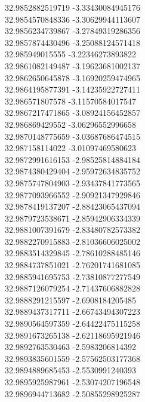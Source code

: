 {32.9852882519719	-3.33430084945176\\
32.9854570848336	-3.30629944113607\\
32.9856234739867	-3.27849319286356\\
32.9857874430496	-3.25088124571418\\
32.985949015555	-3.22346273893822\\
32.9861082149487	-3.19623681002137\\
32.9862650645878	-3.16920259474965\\
32.9864195877391	-3.14235922727411\\
32.986571807578	-3.11570584017547\\
32.9867217471865	-3.08924156452857\\
32.986869429552	-3.06296552996658\\
32.9870148775659	-3.03687686474515\\
32.987158114022	-3.01097469580623\\
32.9872991616153	-2.98525814884184\\
32.9874380429404	-2.95972634835752\\
32.9875747804903	-2.93437841773565\\
32.9877093966552	-2.90921347929846\\
32.9878419137207	-2.88423065437094\\
32.9879723538671	-2.85942906334339\\
32.9881007391679	-2.83480782573382\\
32.9882270915883	-2.81036606025002\\
32.9883514329845	-2.78610288485146\\
32.9884737851021	-2.76201741681085\\
32.9885941695753	-2.73810877277549\\
32.9887126079254	-2.71437606882828\\
32.9888291215597	-2.6908184205485\\
32.9889437317711	-2.66743494307223\\
32.9890564597359	-2.64422475115258\\
32.9891673265138	-2.62118695921946\\
32.9892763530463	-2.5983206814392\\
32.9893835601559	-2.57562503177368\\
32.9894889685453	-2.5530991240393\\
32.9895925987961	-2.53074207196548\\
32.9896944713682	-2.50855298925287\\
}
